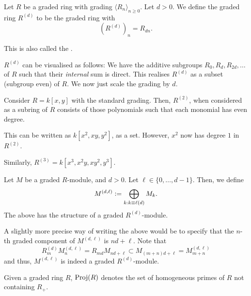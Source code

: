 \documentclass[12pt]{article}
\begin{document}
\begin{defn}
	Let $R$ be a graded ring with grading $\langle R_{n} \rangle_{n \ge 0}$. Let $d > 0$. \newline
	We define the  graded ring $R^{(d)}$ to be the graded ring with
	\begin{equation*} 
		\left(R^{(d)}\right)_{n} = R_{dn}.
	\end{equation*}

	This is also called the .
\end{defn}

$R^{(d)}$ can be visualised as follows: We have the additive subgroups $R_{0}, R_{d}, R_{2d}, \ldots$ of $R$ such that their \emph{internal} sum is direct. This realises $R^{(d)}$ as a subset (subgroup even) of $R$. We now just scale the grading by $d$.

\begin{ex}
	Consider $R = k[x, y]$ with the standard grading. Then, $R^{(2)}$, when considered as a subring of $R$ consists of those polynomials such that each monomial has even degree. 

	This can be written as $k[x^{2}, xy, y^{2}]$, as a set. However, $x^{2}$ now has degree $1$ in $R^{(2)}$.

	Similarly, $R^{(3)} = k[x^{3}, x^{2}y, xy^{2}, y^{3}]$.
\end{ex}

\begin{defn}
	Let $M$ be a graded $R$-module, and $d > 0$. Let $\ell \in \{0, \ldots, d - 1\}$. Then, we define
	\begin{equation*} 
		M^{(d, \ell)} \vcentcolon= \bigoplus_{k : k \equiv \ell (d)} M_{k}.	
	\end{equation*}
	The above has the structure of a graded $R^{(d)}$-module.
\end{defn}
A slightly more precise way of writing the above would be to specify that the $n$-th graded component of $M^{(d, \ell)}$ is $nd + \ell$. Note that
\begin{equation*} 
	R^{(d)}_{m} M^{(d, \ell)}_{n} = R_{md} M_{nd + \ell} \subset M_{(m + n)d + \ell} = M^{(d, \ell)}_{m + n}
\end{equation*}
and thus, $M^{(d, \ell)}$ is indeed a graded $R^{(d)}$-module.

\begin{defn}
	Given a graded ring $R$, $\operatorname{Proj}(R)$ denotes the set of homogeneous primes of $R$ not containing $R_{+}$.
\end{defn}
\end{document}
